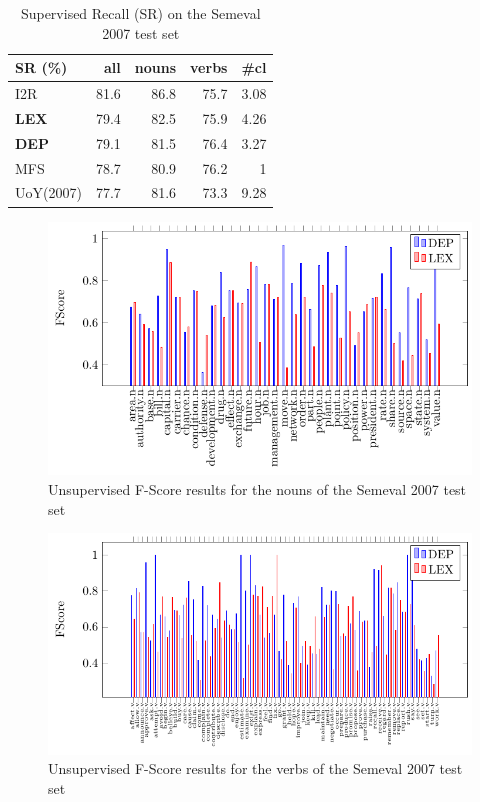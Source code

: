 \begin{table}[!htb]
\centering

\begin{tabular}{@{}lrrrr@{}}
\toprule
\textbf{SR (\%)} & \textbf{all} & \textbf{nouns} & \textbf{verbs} & \textbf{\#cl} \\ \midrule
I2R & 81.6 & 86.8 & 75.7 & 3.08 \\
\textbf{LEX} & 79.4 & 82.5 & 75.9 & 4.26 \\
\textbf{DEP} & 79.1 & 81.5 & 76.4 & 3.27\\
MFS & 78.7 & 80.9 & 76.2 & 1 \\
UoY(2007) & 77.7 & 81.6 & 73.3 & 9.28 \\ \bottomrule
\end{tabular}
\caption{Supervised Recall (SR) on the Semeval 2007 test set}
\label{tab:sem2007_sup_recall}
\end{table}



 \begin{figure}[!htb]
\centering
\includegraphics[width=1\linewidth]{images/Chapitre5/tex_img_files/nouns_fs.pdf}
\caption{Unsupervised F-Score results for the nouns of the Semeval 2007 test set}
\label{fig:nouns_fs}
\end{figure}

 \begin{figure}[!htb]
\centering
\includegraphics[width=1\linewidth]{images/Chapitre5/tex_img_files/verbs_fs.pdf}
\caption{Unsupervised F-Score results for the verbs of the Semeval 2007 test set}
\label{fig:verbs_fs}
\end{figure}




